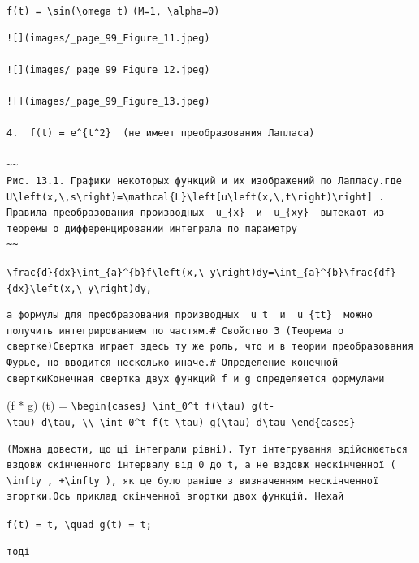 \documentclass[
  ukrainian,
]{article}
\begin{document}
\texttt{f(t)\ =\ \textbackslash{}sin(\textbackslash{}omega\ t)}
\texttt{(M=1,\ \textbackslash{}alpha=0)}

\begin{verbatim}
![](images/_page_99_Figure_11.jpeg)

![](images/_page_99_Figure_12.jpeg)

![](images/_page_99_Figure_13.jpeg)

4.  f(t) = e^{t^2}  (не имеет преобразования Лапласа)

~~
Рис. 13.1. Графики некоторых функций и их изображений по Лапласу.где  U\left(x,\,s\right)=\mathcal{L}\left[u\left(x,\,t\right)\right] . Правила преобразования производных  u_{x}  и  u_{xy}  вытекают из теоремы о дифференцировании интеграла по параметру
~~
\end{verbatim}

\texttt{\textbackslash{}frac\{d\}\{dx\}\textbackslash{}int\_\{a\}\^{}\{b\}f\textbackslash{}left(x,\textbackslash{}\ y\textbackslash{}right)dy=\textbackslash{}int\_\{a\}\^{}\{b\}\textbackslash{}frac\{df\}\{dx\}\textbackslash{}left(x,\textbackslash{}\ y\textbackslash{}right)dy,}

\begin{verbatim}
а формулы для преобразования производных  u_t  и  u_{tt}  можно получить интегрированием по частям.# Свойство 3 (Теорема о свертке)Свертка играет здесь ту же роль, что и в теории преобразования Фурье, но вводится несколько иначе.# Определение конечной сверткиКонечная свертка двух функций f и g определяется формулами
\end{verbatim}

(f * g) (t) =
\texttt{\textbackslash{}begin\{cases\}\ \textbackslash{}int\_0\^{}t\ f(\textbackslash{}tau)\ g(t-\textbackslash{}tau)\ d\textbackslash{}tau,\ \textbackslash{}\textbackslash{}\ \textbackslash{}int\_0\^{}t\ f(t-\textbackslash{}tau)\ g(\textbackslash{}tau)\ d\textbackslash{}tau\ \textbackslash{}end\{cases\}}

\begin{verbatim}
(Можна довести, що ці інтеграли рівні). Тут інтегрування здійснюється вздовж скінченного інтервалу від 0 до t, а не вздовж нескінченної ( \infty , +\infty ), як це було раніше з визначенням нескінченної згортки.Ось приклад скінченної згортки двох функцій. Нехай
\end{verbatim}

\texttt{f(t)\ =\ t,\ \textbackslash{}quad\ g(t)\ =\ t;}

\begin{verbatim}
тоді
\end{verbatim}
\end{document}
